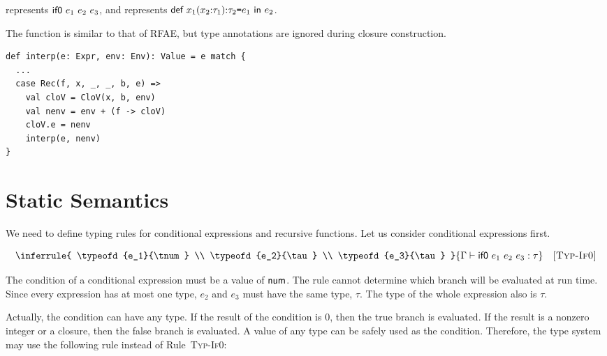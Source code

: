  represents $\textsf{if0}\ e_1\ e_2\ e_3$, and
 represents
$\textsf{def}\ x_1(x_2{:}\tau_1){:}\tau_2\texttt{=} e_1\ \textsf{in}\ e_2$.

The  function is similar to that of \textsf{RFAE}, but type
annotations are ignored during closure construction.

\begin{verbatim}
def interp(e: Expr, env: Env): Value = e match {
  ...
  case Rec(f, x, _, _, b, e) =>
    val cloV = CloV(x, b, env)
    val nenv = env + (f -> cloV)
    cloV.e = nenv
    interp(e, nenv)
}
\end{verbatim}

\section{Static Semantics}

We need to define typing rules for conditional expressions and recursive
functions. Let us consider conditional expressions first.


\vspace{-1em}

\[
  \inferrule
  { \typeofd{e_1}{\tnum} \\
    \typeofd{e_2}{\tau} \\
    \typeofd{e_3}{\tau} }
  { \typeofd{\eifz{e_1}{e_2}{e_3}}{\tau} }
  \quad\textsc{[Typ-If0]}
\]

The condition of a conditional expression must be a value of $\textsf{num}$.
The rule cannot determine which branch will be evaluated at run time.
Since every expression has at most one type, $e_2$ and $e_3$ must have the same
type, $\tau$. The type of the whole expression also is $\tau$.

Actually, the condition can have any type. If the result of
the condition is $0$, then the true branch is evaluated. If the result is a
nonzero integer or a closure, then the false branch is evaluated.
A value of any type can be safely used as the condition.
Therefore, the type system may use the following rule instead of
Rule~\textsc{Typ-If0}:

